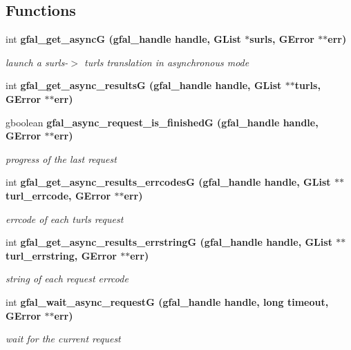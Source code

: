 \subsection*{Functions}
\begin{CompactItemize}
\item 
int \bf{gfal\_\-get\_\-async\-G} (gfal\_\-handle handle, GList $\ast$surls, GError $\ast$$\ast$err)
\begin{CompactList}\small\item\em launch a surls-$>$ turls translation in asynchronous mode \item\end{CompactList}\item 
int \bf{gfal\_\-get\_\-async\_\-results\-G} (gfal\_\-handle handle, GList $\ast$$\ast$turls, GError $\ast$$\ast$err)
\item 
gboolean \bf{gfal\_\-async\_\-request\_\-is\_\-finished\-G} (gfal\_\-handle handle, GError $\ast$$\ast$err)
\begin{CompactList}\small\item\em progress of the last request \item\end{CompactList}\item 
int \bf{gfal\_\-get\_\-async\_\-results\_\-errcodes\-G} (gfal\_\-handle handle, GList $\ast$$\ast$turl\_\-errcode, GError $\ast$$\ast$err)
\begin{CompactList}\small\item\em errcode of each turls request \item\end{CompactList}\item 
int \bf{gfal\_\-get\_\-async\_\-results\_\-errstring\-G} (gfal\_\-handle handle, GList $\ast$$\ast$turl\_\-errstring, GError $\ast$$\ast$err)
\begin{CompactList}\small\item\em string of each request errcode \item\end{CompactList}\item 
int \bf{gfal\_\-wait\_\-async\_\-request\-G} (gfal\_\-handle handle, long timeout, GError $\ast$$\ast$err)
\begin{CompactList}\small\item\em wait for the current request \item\end{CompactList}\end{CompactItemize}


